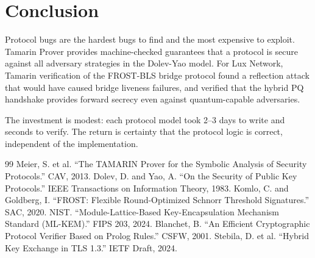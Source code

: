 \section{Conclusion}


Protocol bugs are the hardest bugs to find and the most expensive to exploit. Tamarin
Prover provides machine-checked guarantees that a protocol is secure against all
adversary strategies in the Dolev-Yao model. For Lux Network, Tamarin verification of
the FROST-BLS bridge protocol found a reflection attack that would have caused bridge
liveness failures, and verified that the hybrid PQ handshake provides forward secrecy
even against quantum-capable adversaries.

The investment is modest: each protocol model took 2--3 days to write and seconds to
verify. The return is certainty that the protocol logic is correct, independent of the
implementation.

\begin{thebibliography}{99}
 Meier, S. et al. ``The TAMARIN Prover for the Symbolic Analysis of Security Protocols.'' CAV, 2013.
 Dolev, D. and Yao, A. ``On the Security of Public Key Protocols.'' IEEE Transactions on Information Theory, 1983.
 Komlo, C. and Goldberg, I. ``FROST: Flexible Round-Optimized Schnorr Threshold Signatures.'' SAC, 2020.
 NIST. ``Module-Lattice-Based Key-Encapsulation Mechanism Standard (ML-KEM).'' FIPS 203, 2024.
 Blanchet, B. ``An Efficient Cryptographic Protocol Verifier Based on Prolog Rules.'' CSFW, 2001.
 Stebila, D. et al. ``Hybrid Key Exchange in TLS 1.3.'' IETF Draft, 2024.
\end{thebibliography}

